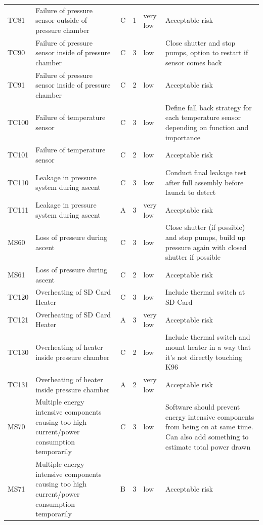 \begin{longtable}{L{1.5cm}L{3cm}L{1cm}L{1cm}L{2cm}L{6cm}}
 TC81 & Failure of pressure sensor outside of pressure chamber & C & 1 & very low & Acceptable risk \\
 TC90 & Failure of pressure sensor inside of pressure chamber & C & 3 & low & Close shutter and stop pumps, option to restart if sensor comes back \\
 TC91 & Failure of pressure sensor inside of pressure chamber & C & 2 & low & Acceptable risk \\
 TC100 & Failure of temperature sensor & C & 3 & low & Define fall back strategy for each temperature sensor depending on function and importance \\
 TC101 & Failure of temperature sensor & C & 2 & low & Acceptable risk \\
 TC110 & Leakage in pressure system during ascent & C & 3 & low & Conduct final leakage test after full assembly before launch to detect \\
 TC111 & Leakage in pressure system during ascent & A & 3 & very low & Acceptable risk \\
 MS60 & Loss of pressure during ascent & C & 3 & low & Close shutter (if possible) and stop pumps, build up pressure again with closed shutter if possible \\
 MS61 & Loss of pressure during ascent & C & 2 & low & Acceptable risk \\
 TC120 & Overheating of SD Card Heater & C & 3 & low & Include thermal switch at SD Card \\
 TC121 & Overheating of SD Card Heater & A & 3 & very low & Acceptable risk \\
 TC130 & Overheating of heater inside pressure chamber & C & 2 & low & Include thermal switch and mount heater in a way that it's not directly touching K96 \\
 TC131 & Overheating of heater inside pressure chamber & A & 2 & very low & Acceptable risk \\
 MS70 & Multiple energy intensive components causing too high current/power consumption temporarily & C & 3 & low & Software should prevent energy intensive components from being on at same time. Can also add something to estimate total power drawn \\
 MS71 & Multiple energy intensive components causing too high current/power consumption temporarily & B & 3 & low & Acceptable risk \\

\end{longtable}

